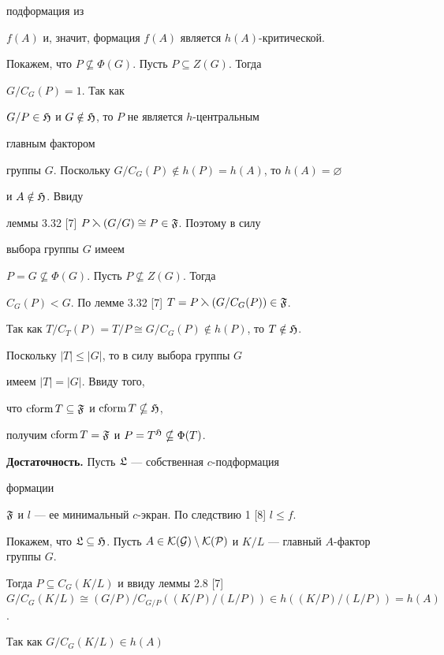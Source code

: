 \begin{pf}
подформация из 


$f(A)$ и, значит, формация $f(A)$ является $h(A)$-критической. 


 


Покажем, что $P\nsubseteq\Phi(G)$. Пусть $P\subseteq Z(G)$. Тогда 


$G/C_G(P)=1$. Так как 


$G/P\in\frak H$ и $G\notin\frak H$, то $P$ не является $h$-центральным 


главным фактором 


группы $G$. Поскольку $G/C_G(P)\notin h(P)=h(A)$, то $h(A)=\varnothing$ 


и $A\notin\frak H$. Ввиду 


леммы 3.32 [7] $P\leftthreetimes(G/G)\cong P\in\frak F$. Поэтому в силу 


выбора группы $G$ имеем 


$P=G\nsubseteq\Phi(G)$. Пусть $P\nsubseteq Z(G)$. Тогда 


$C_G(P)<G$. По лемме 3.32 [7] $T=P\leftthreetimes(G/C_G(P))\in\frak F$. 


Так как $T/C_T(P)=T/P\cong G/C_G(P)\notin h(P)$, то $T\notin\frak H$. 


Поскольку $|T|\le|G|$, то в силу выбора группы $G$ 


имеем $|T|=|G|$. Ввиду того, 


что $\operatorname{cform} T\subseteq\frak F$ и $\operatorname{cform} T\nsubseteq\frak H$, 


получим $\operatorname{cform} T=\frak F$ и $P=T^{\frak H}\nsubseteq\Phi(T)$. 


\smallskip 


 


{\bf Достаточность.} Пусть $\frak L$ --- собственная $c$-подформация 


формации 


$\frak F$ и $l$ --- ее минимальный $c$-экран. По следствию 1 [8] $l\le 


f$. 


Покажем, что $\frak L\subseteq\frak H$. Пусть $A\in\cal 


K(G)\setminus\cal K(P)$ и $K/L$ --- главный $A$-фактор группы $G$. 


Тогда $P\subseteq C_G(K/L)$ и ввиду леммы 2.8 [7] $G/C_G(K/L)\cong 


(G/P)/C_{G/P}((K/P)/(L/P))\in h((K/P)/(L/P))=h(A)$. 


Так как $G/C_G(K/L)\in h(A)$ 



\end{pf}
